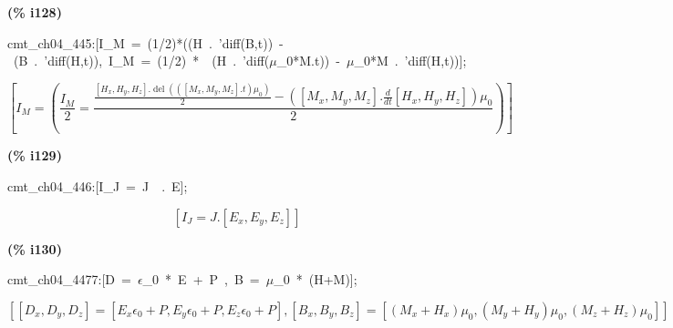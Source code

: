 \documentclass[fleqn]{article}
\begin{document}
\noindent
\begin{minipage}[t]{4.000000em}\color{red}\bfseries
(\% i128)	
\end{minipage}
\begin{minipage}[t]{\textwidth}\color{blue}
cmt\_ch04\_445:[I\_M\ =\ (1/2)*((H\ .\ 'diff(B,t))\ -\ (B\ .\ 'diff(H,t)),\ I\_M\ =\ (1/2)\ *\ \ (H\ .\ 'diff(\ensuremath{\mu}\_0*M.t))\ -\ \ensuremath{\mu}\_0*M\ .\ 'diff(H,t))];
\end{minipage}
\[\displaystyle \tag{\% o128} 
\left[ {I_M}=\left( \frac{{I_M}}{2}=\frac{\frac{\left[ {H_x}\operatorname{,}{H_y}\operatorname{,}{H_z}\right] \ensuremath{\mathrm{ . }}\operatorname{del}\left( \left( \left[ {M_x}\operatorname{,}{M_y}\operatorname{,}{M_z}\right] \ensuremath{\mathrm{ . }}t\right)  {{\mu }_0}\right) }{2}-\left( \left[ {M_x}\operatorname{,}{M_y}\operatorname{,}{M_z}\right] \ensuremath{\mathrm{ . }}\frac{d}{d t} \left[ {H_x}\operatorname{,}{H_y}\operatorname{,}{H_z}\right] \right)  {{\mu }_0}}{2}\right) \right] \mbox{}
\]


\noindent
\begin{minipage}[t]{4.000000em}\color{red}\bfseries
(\% i129)	
\end{minipage}
\begin{minipage}[t]{\textwidth}\color{blue}
cmt\_ch04\_446:[I\_J\ =\ J\ \ .\ E];
\end{minipage}
\[\displaystyle \tag{\% o129} 
\left[ {I_J}=J\ensuremath{\mathrm{ . }}\left[ {E_x}\operatorname{,}{E_y}\operatorname{,}{E_z}\right] \right] \mbox{}
\]


\noindent
\begin{minipage}[t]{4.000000em}\color{red}\bfseries
(\% i130)	
\end{minipage}
\begin{minipage}[t]{\textwidth}\color{blue}
cmt\_ch04\_4477:[D\ =\ \ensuremath{\epsilon}\_0\ *\ E\ +\ P\ ,\ B\ =\ \ensuremath{\mu}\_0\ *\ (H+M)];
\end{minipage}
\[\displaystyle \tag{\% o130} 
\left[ \left[ {D_x}\operatorname{,}{D_y}\operatorname{,}{D_z}\right] =\left[ {E_x} {{\epsilon }_0}+P\operatorname{,}{E_y} {{\epsilon }_0}+P\operatorname{,}{E_z} {{\epsilon }_0}+P\right] \operatorname{,}\left[ {B_x}\operatorname{,}{B_y}\operatorname{,}{B_z}\right] =\left[ \left( {M_x}+{H_x}\right)  {{\mu }_0}\operatorname{,}\left( {M_y}+{H_y}\right)  {{\mu }_0}\operatorname{,}\left( {M_z}+{H_z}\right)  {{\mu }_0}\right] \right] \mbox{}
\]
\end{document}
